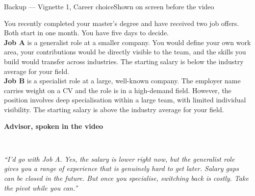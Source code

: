\documentclass[aspectratio=169,10pt]{beamer}
\newcommand{\panelhead}[1]{\noindent\colorbox{kncyan}{\parbox{0.96\textwidth}{\centering\vspace{1pt}\color{white}\scriptsize\bfseries #1\vspace{1pt}}}\\[0.25em]}
\begin{document}
\begin{frame}{Backup — Vignette 1, Career choice}{Shown on screen before the video}
  \vspace{0.4em}
  \noindent\colorbox{knlight}{\parbox{0.975\textwidth}{\vspace{3pt}\scriptsize
  You recently completed your master's degree and have received two job offers. Both start in one month. You have five days to decide.\\[0.5em]
  \textbf{Job A} is a generalist role at a smaller company. You would define your own work area, your contributions would be directly visible to the team, and the skills you build would transfer across industries. The starting salary is below the industry average for your field.\\[0.5em]
  \textbf{Job B} is a specialist role at a large, well-known company. The employer name carries weight on a CV and the role is in a high-demand field. However, the position involves deep specialisation within a large team, with limited individual visibility. The starting salary is above the industry average for your field.\vspace{3pt}}}
  \vspace{0.8em}

  \panelhead{Advisor, spoken in the video}
  \noindent\colorbox{knpale}{\parbox{0.975\textwidth}{\vspace{3pt}\scriptsize\itshape
  ``I'd go with Job A. Yes, the salary is lower right now, but the generalist role gives you a range of experience that is genuinely hard to get later. Salary gaps can be closed in the future. But once you specialise, switching back is costly. Take the pivot while you can.''\vspace{3pt}}}
\end{frame}
\end{document}
